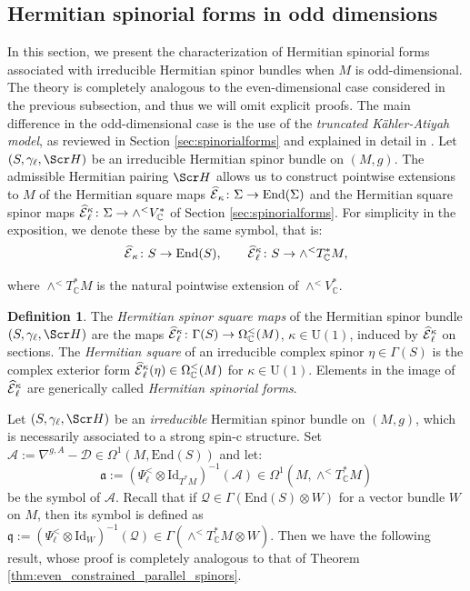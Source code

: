 \documentclass[10pt,a4paper,twoside,reqno]{amsart}
\theoremstyle{plain}
\theoremstyle{definition}
\newtheorem{definition}[thm]{Definition}
\theoremstyle{remark}
\newcommand{\End}{\mathrm{End}}
\def\C{\mathbb{C}}
\def\cQ{\mathcal{Q}}
\def\Id{\mathrm{Id}}
\def\fra{\mathfrak{a}}
\def\frq{\mathfrak{q}}
\def\scS{\Scr H}
\def\U{\mathrm{U}}
\def\cD{\mathcal{D}}
\def\cA{\mathcal{A}}
\def\hcE{\smash{\widehat{\mathcal{E}}}}
\begin{document}

\subsection{Hermitian spinorial forms in odd dimensions}


In this section, we present the characterization of Hermitian spinorial forms associated with irreducible Hermitian spinor bundles when $M$ is odd-dimensional. The theory is completely analogous to the even-dimensional case considered in the previous subsection, and thus we will omit explicit proofs. The main difference in the odd-dimensional case is the use of the \emph{truncated Kähler-Atiyah model}, as reviewed in Section \ref{sec:spinorialforms} and explained in detail in \cite{Algebraic_Complex_Square_2025,LBC13,Sha24}. Let $(S,\gamma_\ell,\scS)$ be an irreducible Hermitian spinor bundle on $(M,g)$. The admissible Hermitian pairing $\scS$ allows us to construct pointwise extensions to $M$ of the Hermitian square maps $\hcE_\kappa\colon\Sigma\to\End(\Sigma)$ and the Hermitian square spinor maps $\hcE^\kappa_\ell \colon \Sigma \to \wedge^<V^*_\C$ of Section \ref{sec:spinorialforms}. For simplicity in the exposition, we denote these by the same symbol, that is: 
\begin{eqnarray*}
\hcE_\kappa\colon S\to\End(S),\qquad \hcE^\kappa_\ell\colon S\to\wedge^<T^*_\C M,
\end{eqnarray*}

\noindent
where $\wedge^<T^*_\C M$ is the natural pointwise extension of $\wedge^<V^*_\C$.

\begin{definition}
The \emph{Hermitian spinor square maps} of the Hermitian spinor bundle $(S,\gamma_\ell,\scS)$ are the maps $\hcE^\kappa_\ell\colon\Gamma(S)\to\Omega^<_\C(M)$, $\kappa\in\U(1)$, induced by $\hcE^\kappa_\ell$ on sections. The \emph{Hermitian square} of an irreducible complex spinor $\eta\in\Gamma(S)$ is the complex exterior form $\hcE^\kappa_\ell(\eta)\in\Omega^<_\C(M)$ for $\kappa\in\U(1)$. Elements in the image of $\hcE^\kappa_\ell$ are generically called \emph{Hermitian spinorial forms}.
\end{definition}

Let $(S,\gamma_\ell,\scS)$ be an \emph{irreducible} Hermitian spinor bundle on $(M,g)$, which is necessarily associated to a strong spin-c structure. Set $\cA:=\nabla^{g,A}-\cD\in\Omega^1(M,\End(S))$ and let: $$\fra:=(\Psi^<_\ell\otimes\Id_{T^*M})^{-1}(\cA)\in\Omega^1(M,\wedge^<T^*_\C M)$$ be the symbol of $\cA$. Recall that if $\cQ\in\Gamma(\End(S)\otimes W)$ for a vector bundle $W$ on $M$, then its symbol is defined as $\frq:=(\Psi^<_\ell\otimes\Id_W)^{-1}(\cQ)\in\Gamma(\wedge^<T^*_\C M\otimes W)$. Then we have the following result, whose proof is completely analogous to that of Theorem \ref{thm:even_constrained_parallel_spinors}.
\end{document}
